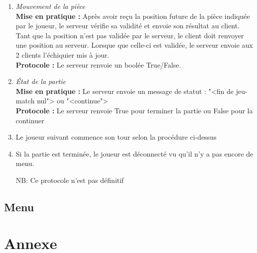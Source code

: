 \documentclass[10pt, a4paper]{article}
\begin{document}
\begin{enumerate}
\item \textit{Mouvement de la pièce} \\
\textbf{Mise en pratique :} Après avoir reçu la position future de la pièce indiquée par le joueur, le serveur vérifie sa validité et envoie son résultat au client. Tant que la position n'est pas validée par le serveur, le client doit renvoyer une position au serveur. Lorsque que celle-ci est validée, le serveur envoie aux 2 clients l'échiquier mis à jour.  \\
\textbf{Protocole :} Le serveur renvoie un boolée True/False. 

\item \textit{État de la partie} \\
\textbf{Mise en pratique :} Le serveur envoie un message de statut : "<fin de jeu-match nul"> ou "<continue"> \\
\textbf{Protocole :} Le serveur renvoie True pour terminer la partie ou False pour la continuer 

\item Le joueur suivant commence son tour selon la procédure ci-dessus

\item Si la partie est terminée, le joueur est déconnecté vu qu'il n'y a pas encore de menu.

NB: Ce protocole n'est pas définitif
\end{enumerate}

\subsection{Menu}

\section{Annexe}
\end{document}
